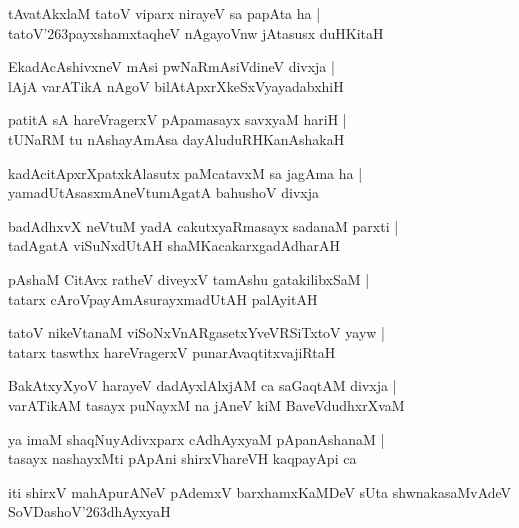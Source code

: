 \begin{shloka}
tAvatAkxlaM tatoV viparx nirayeV sa papAta ha |\\
tatoV\char'263payxshamxtaqheV nAgayoVnw jAtasusx duHKitaH
\end{shloka}

\begin{shloka}
EkadAcAshivxneV mAsi pwNaRmAsiVdineV divxja |\\
lAjA varATikA nAgoV bilAtApxrXkeSxVyayadabxhiH
\end{shloka}

\begin{shloka}
patitA sA hareVragerxV pApamasayx savxyaM hariH |\\
tUNaRM tu nAshayAmAsa dayAluduRHKanAshakaH
\end{shloka}

\begin{shloka}
kadAcitApxrXpatxkAlasutx paMcatavxM sa jagAma ha |\\
yamadUtAsasxmAneVtumAgatA bahushoV divxja
\end{shloka}

\begin{shloka}
badAdhxvX neVtuM yadA cakutxyaRmasayx sadanaM parxti |\\
tadAgatA viSuNxdUtAH shaMKacakarxgadAdharAH
\end{shloka}

\begin{shloka}
pAshaM CitAvx ratheV diveyxV tamAshu gatakilibxSaM |\\
tatarx cAroVpayAmAsurayxmadUtAH palAyitAH 
\end{shloka}

\begin{shloka}
tatoV nikeVtanaM viSoNxVnARgasetxYveVRSiTxtoV yayw |\\
tatarx taswthx hareVragerxV punarAvaqtitxvajiRtaH
\end{shloka}

\begin{shloka}
BakAtxyXyoV harayeV dadAyxlAlxjAM ca saGaqtAM divxja |\\
varATikAM tasayx puNayxM na jAneV kiM BaveVdudhxrXvaM 
\end{shloka}

\begin{shloka}
ya imaM shaqNuyAdivxparx cAdhAyxyaM pApanAshanaM |\\
tasayx nashayxMti pApAni shirxVhareVH kaqpayApi ca
\end{shloka}
iti shirxV mahApurANeV pAdemxV barxhamxKaMDeV sUta shwnakasaMvAdeV SoVDashoV\char'263dhAyxyaH

